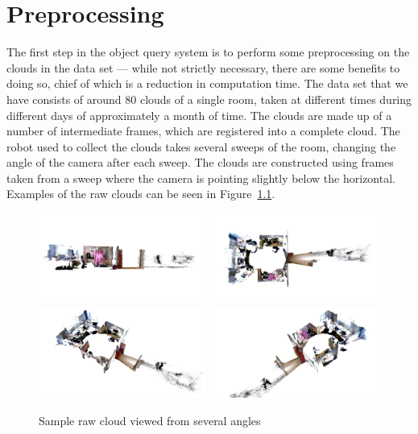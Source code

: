 \documentclass[11pt,a4paper]{kth-mag}
\begin{document}
\chapter{Preprocessing}
\label{chap:preprocess}
The first step in the object query system is to perform some preprocessing on
the clouds in the data set --- while not strictly necessary, there are some
benefits to doing so, chief of which is a reduction in computation time. The
data set that we have consists of around 80 clouds of a single room, taken at
different times during different days of approximately a month of time. The
clouds are made up of a number of intermediate frames, which are registered into
a complete cloud. The robot used to collect the clouds takes several sweeps of
the room, changing the angle of the camera after each sweep. The clouds are
constructed using frames taken from a sweep where the camera is pointing
slightly below the horizontal. Examples of the raw clouds can be seen in
Figure~\ref{fig:orig}.
\begin{figure}
  \centering
  \includegraphics[width=0.49\textwidth]{images/orig_side}
  \includegraphics[width=0.49\textwidth]{images/orig_top}
  \includegraphics[width=0.49\textwidth]{images/orig_diag_left}
  \includegraphics[width=0.49\textwidth]{images/orig_diag_right}
  \caption{Sample raw cloud viewed from several angles}
  \label{fig:orig}
\end{figure}
\end{document}
